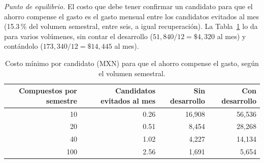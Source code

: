 \documentclass[letterpaper,11pt]{article}
\begin{document}
\noindent\textit{Punto de equilibrio.} El costo que debe tener confirmar un candidato para que el ahorro compense el gasto es el gasto mensual entre los candidatos evitados al mes (15.3\,\% del volumen semestral, entre seis, a igual recuperación). La Tabla~\ref{tab:equilibrio} lo da para varios volúmenes, sin contar el desarrollo ($51{,}840 / 12 = \$4{,}320$ al mes) y contándolo ($173{,}340 / 12 = \$14{,}445$ al mes).

\begin{table}[h]
\centering
\caption{Costo mínimo por candidato (MXN) para que el ahorro compense el gasto, según el volumen semestral.}
\label{tab:equilibrio}
\small
\begin{tabular}{rrrr}
\toprule
Compuestos por semestre & Candidatos evitados al mes & Sin desarrollo & Con desarrollo\\
\midrule
10 & 0.26 & 16,908 & 56,536\\
20 & 0.51 & 8,454 & 28,268\\
40 & 1.02 & 4,227 & 14,134\\
100 & 2.56 & 1,691 & 5,654\\
\bottomrule
\end{tabular}
\end{table}

\printbibliography[title={Fuentes de precios y salarios de los anexos},keyword=anexo]
\end{document}
